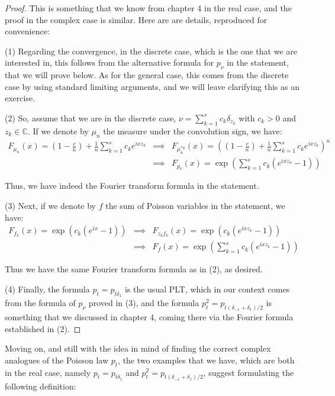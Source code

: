\documentclass[12pt]{amsbook}
\begin{document}
\begin{proof}
This is something that we know from chapter 4 in the real case, and the proof in the complex case is similar. Here are are details, reproduced for convenience:

\medskip

(1) Regarding the convergence, in the discrete case, which is the one that we are interested in, this follows from the alternative formula for $p_\nu$ in the statement, that we will prove below. As for the general case, this comes from the discrete case by using standard limiting arguments, and we will leave clarifying this as an exercise. 

\medskip

(2) So, assume that we are in the discrete case, $\nu=\sum_{k=1}^sc_k\delta_{z_k}$ with $c_k>0$ and $z_k\in\mathbb C$. If we denote by $\mu_n$ the measure under the convolution sign, we have:
\begin{eqnarray*}
F_{\mu_n}(x)=\left(1-\frac{c}{n}\right)+\frac{1}{n}\sum_{k=1}^sc_ke^{ixz_k}
&\implies&F_{\mu_n^{*n}}(x)=\left(\left(1-\frac{c}{n}\right)+\frac{1}{n}\sum_{k=1}^sc_ke^{ixz_k}\right)^n\\
&\implies&F_{p_\nu}(x)=\exp\left(\sum_{k=1}^sc_k(e^{ixz_k}-1)\right)
\end{eqnarray*}

Thus, we have indeed the Fourier transform formula in the statement.

\medskip

(3) Next, if we denote by $f$ the sum of Poisson variables in the statement, we have:
\begin{eqnarray*}
F_{f_k}(x)=\exp(c_k(e^{ix}-1))
&\implies&F_{z_kf_k}(x)=\exp(c_k(e^{ixz_k}-1))\\
&\implies&F_f(x)=\exp\left(\sum_{k=1}^sc_k(e^{ixz_k}-1)\right)
\end{eqnarray*}

Thus we have the same Fourier transform formula as in (2), as desired.

\medskip

(4) Finally, the formula $p_t=p_{t\delta_1}$ is the usual PLT, which in our context comes from the formula of $p_\nu$ proved in (3), and the formula $p_t^2=p_{t(\delta_{-1}+\delta_1)/2}$ is something that we discussed in chapter 4, coming there via the Fourier formula established in (2).
\end{proof}

Moving on, and still with the idea in mind of finding the correct complex analogues of the Poisson law $p_t$, the two examples that we have, which are both in the real case, namely $p_t=p_{t\delta_1}$ and $p_t^2=p_{t(\delta_{-1}+\delta_1)/2}$, suggest formulating the following definition:
\end{document}
